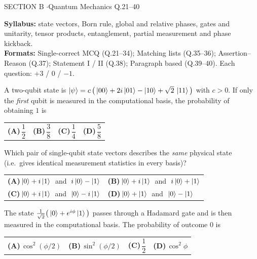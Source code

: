 \documentclass[11pt,a4paper]{article}
\newcommand{\optlabel}[1]{\textbf{(#1)}}
\newenvironment{qitem}[1]{\begin{list}{}{\setlength{\leftmargin}{3.3em}\setlength{\labelwidth}{3.1em}%
  \setlength{\labelsep}{0.2em}\setlength{\topsep}{3pt}\setlength{\parsep}{3pt}}\item[\textbf{Q.#1}\hfill]}{\end{list}}
\newcommand{\qsep}{\par\vspace{2pt}{\color{black!15}\hrule}\vspace{4pt}}
\begin{document}
\newpage

\begin{sectionbanner}SECTION B \enspace$\cdot$\enspace Quantum Mechanics \hfill Q.21--40\end{sectionbanner}

{\small \textbf{Syllabus:} state vectors, Born rule, global and relative phases, gates and unitarity, tensor products, entanglement, partial measurement and phase kickback.\\ \textbf{Formats:} Single-correct MCQ (Q.21--34); Matching lists (Q.35--36); Assertion--Reason (Q.37); Statement I / II (Q.38); Paragraph based (Q.39--40). Each question: $+3$ / $0$ / $-1$.}
\par\medskip

\begin{qitem}{21}
A two-qubit state is $\ket{\psi} = c\,\big(\ket{00} + 2i\ket{01} - \ket{10} + \sqrt2\,\ket{11}\big)$ with $c > 0$.
If only the \emph{first} qubit is measured in the computational basis, the probability of obtaining $1$ is
\par\smallskip\noindent\begin{tabularx}{\linewidth}{@{}*{4}{L}@{}}
\optlabel{A}\,$\dfrac12$ & \optlabel{B}\,$\dfrac38$ & \optlabel{C}\,$\dfrac14$ & \optlabel{D}\,$\dfrac58$
\end{tabularx}
\end{qitem}
\qsep

\begin{qitem}{22}
Which pair of single-qubit state vectors describes the \emph{same} physical state (i.e.\ gives identical
measurement statistics in every basis)?
\par\smallskip\noindent\begin{tabularx}{\linewidth}{@{}*{2}{L}@{}}
\optlabel{A}\,$\ket{0} + i\ket{1}\;$ and $\;i\ket{0} - \ket{1}$ & \optlabel{B}\,$\ket{0} + i\ket{1}\;$ and $\;i\ket{0} + \ket{1}$ \\[3pt]
\optlabel{C}\,$\ket{0} + i\ket{1}\;$ and $\;\ket{0} - i\ket{1}$ & \optlabel{D}\,$\ket{0} + \ket{1}\;$ and $\;\ket{0} - \ket{1}$
\end{tabularx}
\end{qitem}
\qsep

\begin{qitem}{23}
The state $\frac{1}{\sqrt2}\big(\ket{0} + e^{i\phi}\ket{1}\big)$ passes through a Hadamard gate and is then measured
in the computational basis. The probability of outcome $0$ is
\par\smallskip\noindent\begin{tabularx}{\linewidth}{@{}*{4}{L}@{}}
\optlabel{A}\,$\cos^2(\phi/2)$ & \optlabel{B}\,$\sin^2(\phi/2)$ & \optlabel{C}\,$\dfrac12$ & \optlabel{D}\,$\cos^2\phi$
\end{tabularx}
\end{qitem}
\qsep
\end{document}
